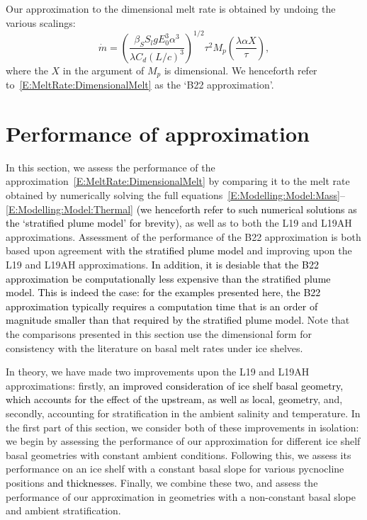 \documentclass[openacc]{rsproca_new}%
\newcommand{\red}[1]{{\color{red} #1}}
\newcommand{\blue}[1]{{\color{blue} #1}}
\newcommand{\rout}[1]{\red{\st{#1}}}\newcommand{\ab}[1]{\textcolor{Green}{#1}}\newcommand{\about}[1]{\textcolor{Cyan}{\sout{#1}}}
\renewcommand{\rout}[1]{{}} %
\renewcommand{\blue}[1]{{\textcolor{black}{#1}}} %
\renewcommand{\red}[1]{{}} %
\begin{document}
Our approximation to the dimensional melt rate is obtained by undoing the various scalings:
\begin{equation}\label{E:MeltRate:DimensionalMelt}
\dot{m} =\left(\frac{\beta_S S_l g  E_0^3 \alpha^3}{\lambda C_d (L/c)^3}\right)^{1/2} \tau^2  M_p\left(\frac{\lambda \alpha X}{\tau}\right),
\end{equation}
where the $X$ in the argument of $M_p$ is dimensional. We henceforth refer to~\eqref{E:MeltRate:DimensionalMelt} as the `B22 approximation'.

\section{Performance of approximation}\label{S:Numerics}
In this section, we assess the performance of the approximation~\eqref{E:MeltRate:DimensionalMelt} by comparing it to the melt rate obtained by numerically solving the full equations~\eqref{E:Modelling:Model:Mass}--\eqref{E:Modelling:Model:Thermal} \blue{(we henceforth refer to such numerical solutions as the `stratified plume model' for brevity)}, as well as to both the L19 and L19AH approximations. Assessment of the performance of the B22 approximation is both based upon agreement with \rout{numerical solutions }\blue{the stratified plume model} and improving upon the L19 and L19AH approximations. \blue{In addition, it is desiable that the B22 approximation be computationally less expensive than the stratified plume model. This is indeed the case: for the examples presented here, the B22 approximation typically requires a computation time that is an order of magnitude smaller than that required by the stratified plume model.} Note that the comparisons presented in this section use the dimensional form for consistency with the literature on basal melt rates under ice shelves.

In theory, we have made two improvements upon the L19 and L19AH approximations: firstly, \blue{an improved consideration of ice shelf basal geometry, which accounts for the effect of the upstream, as well as local, geometry}\rout{accounting for a general ice shelf basal geometry and capturing non-local geometric effects}, and, secondly, accounting for stratification in the ambient salinity and temperature. In the first part of this section, we consider both of these improvements in isolation: we begin by assessing the performance of our approximation for different ice shelf basal geometries with constant ambient conditions. Following this, we assess its performance on an ice shelf with a constant basal slope for various pycnocline positions \blue{and thicknesses}. Finally, we combine these two, and assess the performance of our approximation in geometries with a non-constant basal slope and ambient stratification.
\end{document}
